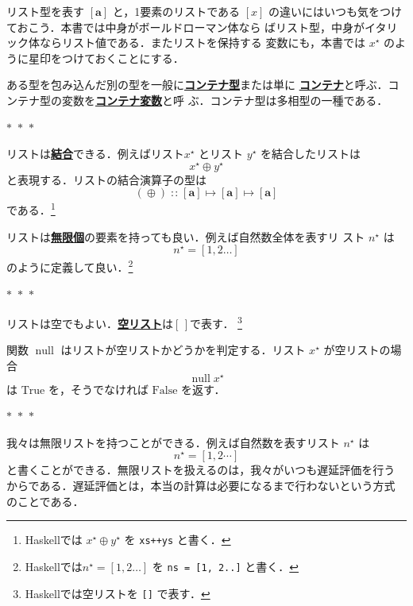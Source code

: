 \documentclass[a5paper,twoside,fleqn,draft]{jsbook}
\newcommand{\separator}{\begin{center}$*$~$*$~$*$\end{center}}
\newcommand{\programminglanguage}[1]{\textsf{#1}}
\newcommand{\haskell}{\programminglanguage{Haskell}}
\newcommand{\keyword}[1]{{\underline{\textbf{#1}}}}
\newcommand{\code}[1]{\texttt{#1}}
\newcommand{\mSpecialConstant}[1]{\textrm{#1}}
\newcommand{\mEmptyList}{{[\,]}}
\newcommand{\mFalse}{\mSpecialConstant{False}}
\newcommand{\mTrue}{\mSpecialConstant{True}}
\newcommand{\mSpecialFunc}[1]{#1}
\DeclareMathOperator{\mNull}{\mSpecialFunc{null}}
\DeclareMathOperator{\mAppend}{\oplus}
\DeclareMathOperator{\mIn}{{:\!:}}
\DeclareMathOperator{\mMapsTo}{\mapsto}
\newcommand{\mType}[1]{\mathbf{#1}} %
\newcommand{\mA}{\mType{a}}
\newcommand{\mTupleWith}[1]{\left(#1\right)} %
\newcommand{\mList}[1]{{#1}^\mathrm{\star}}
\begin{document}
リスト型を表す $[\mA]$ と，1要素のリストである $[x]$
の違いにはいつも気をつけておこう．本書では中身がボールドローマン体なら
ばリスト型，中身がイタリック体ならリスト値である．またリストを保持する
変数にも，本書では $\mList{x}$ のように星印をつけておくことにする．

ある型を包み込んだ別の型を一般に\keyword{コンテナ型}または単に
\keyword{コンテナ}と呼ぶ．コンテナ型の変数を\keyword{コンテナ変数}と呼
ぶ．コンテナ型は多相型の一種である．


\separator

リストは\keyword{結合}できる．例えばリスト$\mList{x}$ とリスト
$\mList{y}$ を結合したリストは
\begin{equation}
  \mList{x}\mAppend\mList{y}
\end{equation}
と表現する．リストの結合演算子の型は
\begin{equation}
  (\mAppend)
  \mIn[\mA]\mMapsTo[\mA]\mMapsTo[\mA]
\end{equation}
である．\footnote{\haskell では $\mList{x}\mAppend\mList{y}$ を
  \code{xs++ys} と書く．}

リストは\keyword{無限個}の要素を持っても良い．例えば自然数全体を表すリ
スト $\mList{n}$ は
\begin{equation}
\mList{n}=[1,2\dots]
\end{equation}
のように定義して良い．\footnote{\haskell では$\mList{n}=[1,2\dots]$ を
  \code{ns = [1, 2..]} と書く．}

\separator

リストは空でもよい．\keyword{空リスト}は$\mEmptyList$で表す．
\footnote{\haskell では空リストを \code{[]} で表す．}

関数 $\mNull$ はリストが空リストかどうかを判定する．リスト $\mList{x}$
が空リストの場合
\begin{equation}
  \mNull\mList{x}
\end{equation}
は $\mTrue$ を，そうでなければ $\mFalse$ を返す．

\separator

我々は無限リストを持つことができる．例えば自然数を表すリスト
$\mList{n}$ は
\begin{equation*}
  \mList{n}
  =[1,2\dotsb]
\end{equation*}
と書くことができる．無限リストを扱えるのは，我々がいつも遅延評価を行う
からである．遅延評価とは，本当の計算は必要になるまで行わないという方式
のことである．
\end{document}

